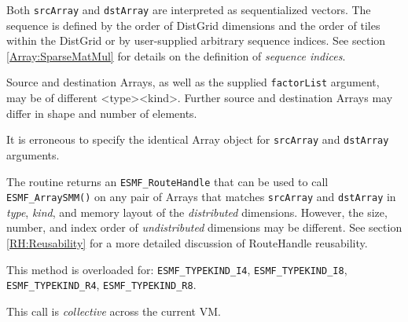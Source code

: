     Both {\tt srcArray} and {\tt dstArray} are interpreted as sequentialized
     vectors. The sequence is defined by the order of DistGrid dimensions and 
     the order of tiles within the DistGrid or by user-supplied arbitrary
     sequence indices. See section \ref{Array:SparseMatMul} for details on the
     definition of {\em sequence indices}.
  
     Source and destination Arrays, as well as the supplied {\tt factorList}
     argument, may be of different <type><kind>. Further source and
     destination Arrays may differ in shape and number of elements.
  
     It is erroneous to specify the identical Array object for {\tt srcArray} and
     {\tt dstArray} arguments.
  
     The routine returns an {\tt ESMF\_RouteHandle} that can be used to call 
     {\tt ESMF\_ArraySMM()} on any pair of Arrays that matches 
     {\tt srcArray} and {\tt dstArray} in {\em type}, {\em kind}, and 
     memory layout of the {\em distributed} dimensions. However, the size,
     number, and index order of {\em undistributed} dimensions may be different.
     See section \ref{RH:Reusability} for a more detailed discussion of
     RouteHandle reusability.
  
     This method is overloaded for:\newline
     {\tt ESMF\_TYPEKIND\_I4}, {\tt ESMF\_TYPEKIND\_I8},\newline 
     {\tt ESMF\_TYPEKIND\_R4}, {\tt ESMF\_TYPEKIND\_R8}.
  
     This call is {\em collective} across the current VM.
  
